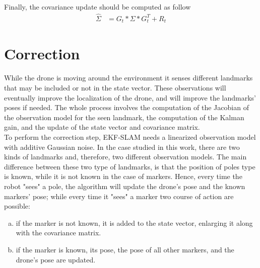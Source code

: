 Finally, the covariance update should be computed as follow
\begin{align}
    \hat\Sigma &= G_t * \Sigma * G_t^T + R_t
\end{align}

\section{Correction}
\label{sec:chapter2:correction}
While the drone is moving around the environment it senses different landmarks that may be included or not in the state vector. These observations will eventually improve the localization of the drone, and will improve the landmarks' poses if needed. The whole process involves the computation of the Jacobian of the observation model for the seen landmark, the computation of the Kalman gain, and the update of the state vector and covariance matrix.\\

To perform the correction step, EKF-SLAM needs a linearized observation model with additive Gaussian noise. In the case studied in this work, there are two kinds of landmarks and, therefore, two different observation models. The main difference between these two type of landmarks, is that the position of poles type is known, while it is not known in the case of markers. Hence, every time the robot "sees" a pole, the algorithm will update the drone's pose and the known markers' pose; while every time it "sees" a marker two course of action are possible:
\begin{enumerate}[a)]
    \item{if the marker is not known, it is added to the state vector, enlarging it along with the covariance matrix.}
    \item{if the marker is known, its pose, the pose of all other markers, and the drone's pose are updated.}
\end{enumerate}

